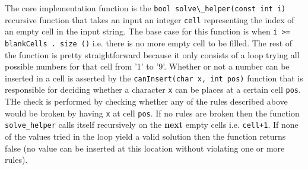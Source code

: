 The core implementation function is the \lstinline[columns=fixed]{bool solve\_helper(const int i)}
recursive function that takes an input an integer \lstinline[columns=fixed]{cell} representing the
index of an empty cell in the input string. The base case for this function is when
\lstinline[columns=fixed]{i >= blankCells . size ()} i.e. there is no more empty cell to be filled.
The rest of the function is pretty straightforward because it only consists of a loop trying all
possible numbers for that cell from '1' to '9'. Whether or not a number can be inserted in a cell is
asserted  by the \lstinline[columns=fixed]{canInsert(char x, int pos)} function that is responsible
for deciding whether a character \lstinline[columns=fixed]{x} can be places at a certain cell
\lstinline[columns=fixed]{pos}. THe check is performed by checking whether any of the rules
described above would be broken by having \lstinline[columns=fixed]{x} at cell
\lstinline[columns=fixed]{pos}. If no rules are broken then the function
\lstinline[columns=fixed]{solve_helper} calls itself recursively on the \textbf{next} empty cells
i.e. \lstinline[columns=fixed]{cell+1}. If none of the values tried in the loop yield a valid
solution then the function returns false (no value can be inserted at this location without
violating one or more rules).

